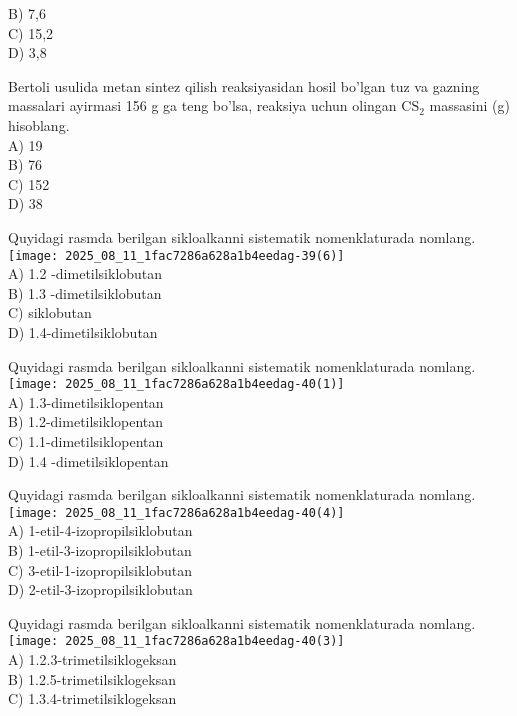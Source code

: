 B) 7,6\\
C) 15,2\\
D) 3,8
  \item Bertoli usulida metan sintez qilish reaksiyasidan hosil bo'lgan tuz va gazning massalari ayirmasi 156 g ga teng bo'lsa, reaksiya uchun olingan $\mathrm{CS}_{2}$ massasini (g) hisoblang.\\
A) 19\\
B) 76\\
C) 152\\
D) 38
  \item Quyidagi rasmda berilgan sikloalkanni sistematik nomenklaturada nomlang.\\
\texttt{[image: 2025\_08\_11\_1fac7286a628a1b4eedag-39(6)]}\\
A) 1.2 -dimetilsiklobutan\\
B) 1.3 -dimetilsiklobutan\\
C) siklobutan\\
D) 1.4-dimetilsiklobutan\\
  \item Quyidagi rasmda berilgan sikloalkanni sistematik nomenklaturada nomlang.\\
\texttt{[image: 2025\_08\_11\_1fac7286a628a1b4eedag-40(1)]}\\
A) 1.3-dimetilsiklopentan\\
B) 1.2-dimetilsiklopentan\\
C) 1.1-dimetilsiklopentan\\
D) 1.4 -dimetilsiklopentan
  \item Quyidagi rasmda berilgan sikloalkanni sistematik nomenklaturada nomlang.\\
\texttt{[image: 2025\_08\_11\_1fac7286a628a1b4eedag-40(4)]}\\
A) 1-etil-4-izopropilsiklobutan\\
B) 1-etil-3-izopropilsiklobutan\\
C) 3-etil-1-izopropilsiklobutan\\
D) 2-etil-3-izopropilsiklobutan
  \item Quyidagi rasmda berilgan sikloalkanni sistematik nomenklaturada nomlang.\\
\texttt{[image: 2025\_08\_11\_1fac7286a628a1b4eedag-40(3)]}\\
A) 1.2.3-trimetilsiklogeksan\\
B) 1.2.5-trimetilsiklogeksan\\
C) 1.3.4-trimetilsiklogeksan\\
